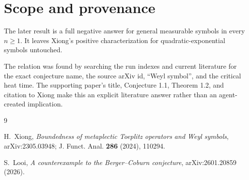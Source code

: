 \documentclass[11pt]{article}
\begin{document}
\section*{Scope and provenance}

The later result is a full negative answer for general measurable symbols in
every $n\geq1$.  It leaves Xiong's positive characterization for
quadratic-exponential symbols untouched.

The relation was found by searching the run indexes and current literature for
the exact conjecture name, the source arXiv id, ``Weyl symbol'', and the
critical heat time.  The supporting paper's title, Conjecture 1.1, Theorem
1.2, and citation to Xiong make this an explicit literature answer rather than
an agent-created implication.

\begin{thebibliography}{9}

H.~Xiong,
\emph{Boundedness of metaplectic Toeplitz operators and Weyl symbols},
arXiv:2305.03948; J. Funct. Anal. \textbf{286} (2024), 110294.

S.~Looi,
\emph{A counterexample to the Berger--Coburn conjecture},
arXiv:2601.20859 (2026).

\end{thebibliography}
\end{document}
